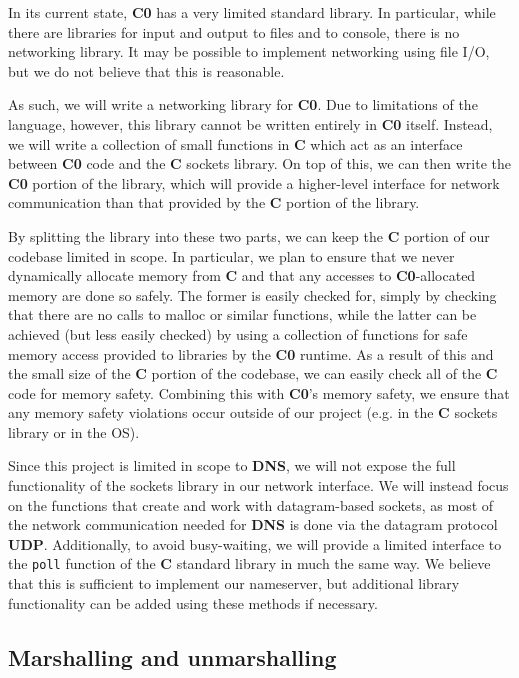 \documentclass{article}
\newcommand\Kwd[1]{{\sffamily\bfseries{#1}}}
\begin{document}
In its current state, \Kwd{C0} has a very limited standard library. In particular, while there are libraries for input and output to files and to console, there is no networking library. It may be possible to implement networking using file I/O, but we do not believe that this is reasonable.

As such, we will write a networking library for \Kwd{C0}. Due to limitations of the language, however, this library cannot be written entirely in \Kwd{C0} itself. Instead, we will write a collection of small functions in \Kwd{C} which act as an interface between \Kwd{C0} code and the \Kwd{C} sockets library. On top of this, we can then write the \Kwd{C0} portion of the library, which will provide a higher-level interface for network communication than that provided by the \Kwd{C} portion of the library.

By splitting the library into these two parts, we can keep the \Kwd{C} portion of our codebase limited in scope. In particular, we plan to ensure that we never dynamically allocate memory from \Kwd{C} and that any accesses to \Kwd{C0}-allocated memory are done so safely. The former is easily checked for, simply by checking that there are no calls to malloc or similar functions, while the latter can be achieved (but less easily checked) by using a collection of functions for safe memory access provided to libraries by the \Kwd{C0} runtime. As a result of this and the small size of the \Kwd{C} portion of the codebase, we can easily check all of the \Kwd{C} code for memory safety. Combining this with \Kwd{C0}'s memory safety, we ensure that any memory safety violations occur outside of our project (e.g. in the \Kwd{C} sockets library or in the OS).

Since this project is limited in scope to \Kwd{DNS}, we will not expose the full functionality of the sockets library in our network interface. We will instead focus on the functions that create and work with datagram-based sockets, as most of the network communication needed for \Kwd{DNS} is done via the datagram protocol \Kwd{UDP}. Additionally, to avoid busy-waiting, we will provide a limited interface to the \texttt{poll} function of the \Kwd{C} standard library in much the same way. We believe that this is sufficient to implement our nameserver, but additional library functionality can be added using these methods if necessary.

\subsection{Marshalling and unmarshalling}
\end{document}

